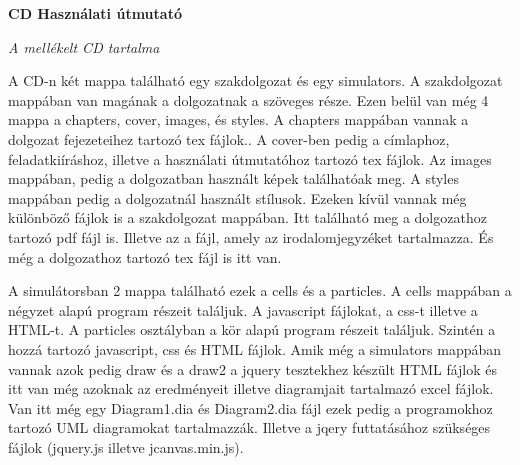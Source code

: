 \pagestyle{empty}

\noindent \textbf{\Large CD Használati útmutató}

\vskip 1cm

\textit{A mellékelt CD tartalma} 

A CD-n két mappa található egy szakdolgozat és egy simulators. A szakdolgozat mappában van magának a dolgozatnak a szöveges része. Ezen belül van még 4 mappa a chapters, cover, images, és styles. A chapters mappában vannak a dolgozat fejezeteihez tartozó tex fájlok.. A cover-ben pedig a címlaphoz, feladatkiíráshoz, illetve a használati útmutatóhoz tartozó tex fájlok. Az images mappában, pedig a dolgozatban használt képek találhatóak meg. A styles mappában pedig a dolgozatnál használt stílusok. Ezeken kívül vannak még különböző fájlok is a szakdolgozat mappában. Itt található meg a dolgozathoz tartozó pdf fájl is. Illetve az a fájl, amely az irodalomjegyzéket tartalmazza. És még a dolgozathoz tartozó tex fájl is itt van. 

A simulátorsban 2 mappa található ezek a cells és a particles. A cells mappában a négyzet alapú program részeit találjuk. A javascript fájlokat, a css-t illetve a HTML-t. 
A particles osztályban a kör alapú program részeit találjuk. Szintén a hozzá tartozó javascript, css és HTML fájlok. 
Amik még a simulators mappában vannak azok pedig draw és a draw2 a jquery tesztekhez készült HTML fájlok és itt van még azoknak az eredményeit illetve diagramjait tartalmazó excel fájlok. Van itt még egy Diagram1.dia és Diagram2.dia fájl ezek pedig a programokhoz tartozó UML diagramokat tartalmazzák. Illetve a jqery futtatásához szükséges fájlok (jquery.js illetve jcanvas.min.js).